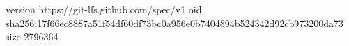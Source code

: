 version https://git-lfs.github.com/spec/v1
oid sha256:17f66ec8887a51f54df60df73bc0a956e0b7404894b524342d92cb973200da73
size 2796364
